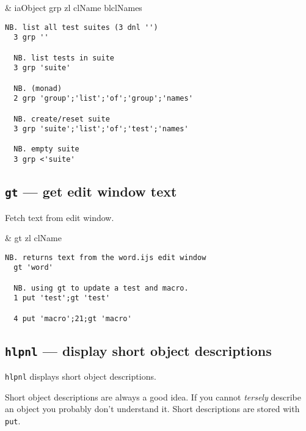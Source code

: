 \begin{wordhead}
\dyad & iaObject grp zl \argsep clName \argsep blclNames \\
\end{wordhead}
\begin{lstlisting}[frame=single,framerule=0pt] 
  NB. list all test suites (3 dnl '')
  3 grp ''  
  
  NB. list tests in suite   
  3 grp 'suite' 
  
  NB. (monad)
  2 grp 'group';'list';'of';'group';'names'  
  
  NB. create/reset suite
  3 grp 'suite';'list';'of';'test';'names'  
  
  NB. empty suite  
  3 grp <'suite' 
\end{lstlisting}


\subsection{\texttt{gt} --- get edit window text} 

Fetch text from edit window.

\begin{wordhead}
\monad & gt zl \argsep clName \\
\end{wordhead}
\begin{lstlisting}[frame=single,framerule=0pt] 
  NB. returns text from the word.ijs edit window
  gt 'word'  

  NB. using gt to update a test and macro.
  1 put 'test';gt 'test' 

  4 put 'macro';21;gt 'macro' 
\end{lstlisting}


\subsection{\texttt{hlpnl} --- display short object descriptions}

\texttt{hlpnl} displays short object descriptions.  

Short object descriptions are always a good idea.  
If you cannot \emph{tersely} describe an object you probably don't 
understand it.  Short descriptions 
are stored with \hypertarget{il:put}{\texttt{put}}.

